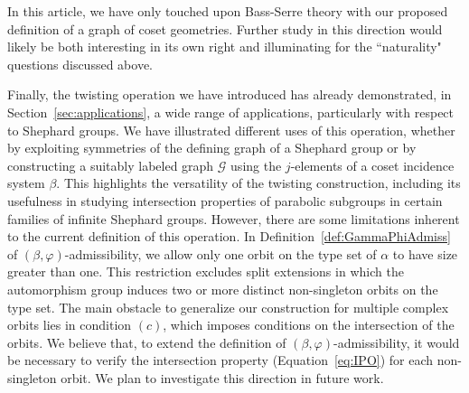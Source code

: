 \documentclass[11pt,letterpaper]{amsart}
\newcommand{\GG}{\mathcal{G}}
\begin{document}
In this article, we have only touched upon Bass-Serre theory with our proposed definition of a graph of coset geometries. Further study in this direction would likely be both interesting in its own right and illuminating for the ``naturality" questions discussed above.
 
Finally, the twisting operation we have introduced has already demonstrated, in Section~\ref{sec:applications}, a wide range of applications, particularly with respect to Shephard groups. We have illustrated different uses of this operation, whether by exploiting symmetries of the defining graph of a Shephard group or by constructing a suitably labeled graph $\GG$ using the $j$-elements of a coset incidence system $\beta$. This highlights the versatility of the twisting construction, including its usefulness in studying intersection properties of parabolic subgroups in certain families of infinite Shephard groups. However, there are some limitations inherent to the current definition of this operation. In Definition~\ref{def:GammaPhiAdmiss} of $(\beta,\varphi)$-admissibility, we allow only one orbit on the type set of $\alpha$ to have size greater than one. This restriction excludes split extensions in which the automorphism group induces two or more distinct non-singleton orbits on the type set. The main obstacle to generalize our construction for multiple complex orbits lies in condition $(c)$, which imposes conditions on the intersection of the orbits. We believe that, to extend the definition of $(\beta,\varphi)$-admissibility, it would be necessary to verify the intersection property (Equation~\ref{eq:IPO}) for each non-singleton orbit. We plan to investigate this direction in future work.


 

\end{document}
